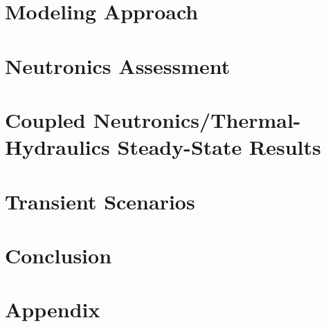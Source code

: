\documentclass[edeposit,fullpage,11pt]{uiucthesis2018}
\begin{document}
\chapter{Modeling Approach}
\label{chap:model}


\chapter{Neutronics Assessment}
\label{nts}


\chapter{Coupled Neutronics/Thermal-Hydraulics Steady-State Results}
\label{chap:ss}


\chapter{Transient Scenarios}
\label{chap:transient}


\chapter{Conclusion}
\label{chap:conclusion}


\chapter*{Appendix}
\label{chap:appendix}
%

\backmatter



\end{document}
